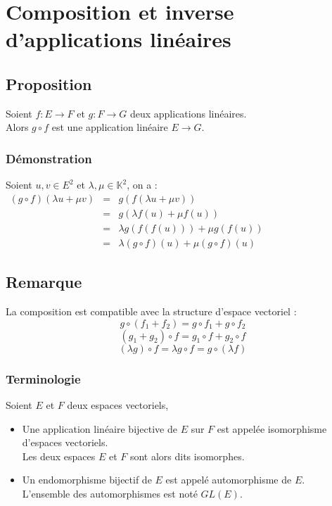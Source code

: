 \documentclass[a4paper,10pt]{book} %
\newcommand{\K}{\mathbb{K}}
\begin{document}
\newpage

\section{Composition et inverse d'applications linéaires}
\subsection{Proposition}
Soient $f:E\rightarrow F$ et $g:F\rightarrow G$ deux applications linéaires.\\
Alors $g\circ f$ est une application linéaire $E\rightarrow G$.

\subsubsection{Démonstration}
Soient $u,v \in E^2$ et $\lambda, \mu \in \K^2$, on a :\\

$\begin{array}{rcl}(g\circ f)(\lambda u+\mu v)&=& g(f(\lambda u+\mu v)) \\
&=& g(\lambda f(u)+\mu f(u))\\
&=& \lambda g(f(f(u)))+\mu g(f(u))\\
&=&\lambda (g\circ f)(u)+\mu (g\circ f)(u)\end{array}$

\subsection{Remarque}
La composition est compatible avec la structure d'espace vectoriel :
$$g\circ (f_1+f_2)=g\circ f_1+g\circ f_2$$
$$(g_1+g_2)\circ f=g_1\circ f+g_2\circ f$$
$$(\lambda g)\circ f=\lambda g\circ f=g\circ (\lambda f)$$

\subsubsection{Terminologie}
Soient $E$ et $F$ deux espaces vectoriels,
\begin{itemize} \item Une application linéaire bijective de $E$ sur $F$ est appelée isomorphisme d'espaces vectoriels.\\
Les deux espaces $E$ et $F$ sont alors dits isomorphes.
\item Un endomorphisme bijectif de $E$ est appelé automorphisme de $E$.\\
L'ensemble des automorphismes est noté $GL(E)$.
\end{itemize}
\end{document}

